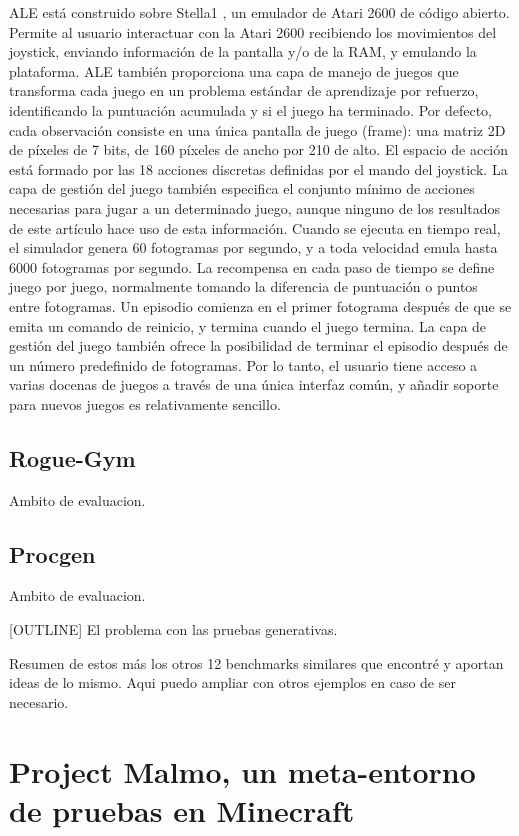 ALE está construido sobre Stella1 , un emulador de Atari 2600 de código abierto. Permite al usuario interactuar con la Atari 2600 recibiendo los movimientos del joystick, enviando información de la pantalla y/o de la RAM, y emulando la plataforma. ALE también proporciona una capa de manejo de juegos que transforma cada juego en un problema estándar de aprendizaje por refuerzo, identificando la puntuación acumulada y si el juego ha terminado. Por defecto, cada observación consiste en una única pantalla de juego (frame): una matriz 2D de píxeles de 7 bits, de 160 píxeles de ancho por 210 de alto. El espacio de acción está formado por las 18 acciones discretas definidas por el mando del joystick. La capa de gestión del juego también especifica el conjunto mínimo de acciones necesarias para jugar a un determinado juego, aunque ninguno de los resultados de este artículo hace uso de esta información. Cuando se ejecuta en tiempo real, el simulador genera 60 fotogramas por segundo, y a toda velocidad emula hasta 6000 fotogramas por segundo. La recompensa en cada paso de tiempo se define juego por juego, normalmente tomando la diferencia de puntuación o puntos entre fotogramas. Un episodio comienza en el primer fotograma después de que se emita un comando de reinicio, y termina cuando el juego termina. La capa de gestión del juego también ofrece la posibilidad de terminar el episodio después de un número predefinido de fotogramas. Por lo tanto, el usuario tiene acceso a varias docenas de juegos a través de una única interfaz común, y añadir soporte para nuevos juegos es relativamente sencillo.

\subsection{Rogue-Gym}
Ambito de evaluacion.
\subsection{Procgen}
Ambito de evaluacion.

[OUTLINE] El problema con las pruebas generativas.

Resumen de estos más los otros 12 benchmarks similares que encontré y aportan ideas de lo mismo. Aqui puedo ampliar con otros ejemplos en caso de ser necesario.

\section{Project Malmo, un meta-entorno de pruebas en Minecraft}\label{section:state-of-the-art:project-malmO}


